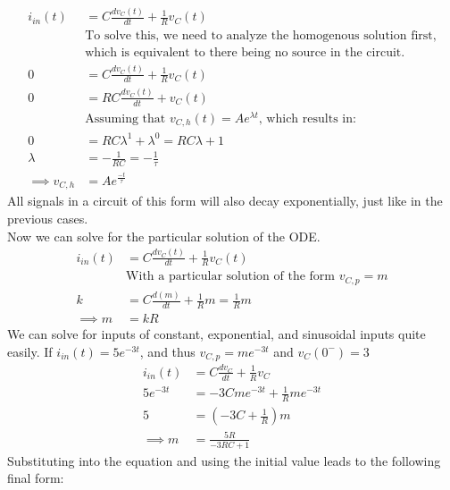 \documentclass[nobib]{tufte-handout}
\begin{document}
\begin{align*}
    i_{in}(t)        & = C\frac{dv_C(t)}{dt}+\frac{1}{R}v_C(t)                                 \\
                     & \text{To solve this, we need to analyze the homogenous solution first,} \\ &\text{which is equivalent to there being no source in the circuit.}\\
    0                & = C\frac{dv_C(t)}{dt}+\frac{1}{R}v_C(t)                                 \\
    0                & = RC\frac{dv_C(t)}{dt}+v_C(t)                                           \\
                     & \text{Assuming that $v_{C,h}(t) = Ae^{\lambda t}$, which results in:}   \\
    0                & = RC \lambda^1 + \lambda^0 = RC \lambda +1                              \\
    \lambda          & = -\frac{1}{RC} = -\frac{1}{\tau}                                       \\
    \implies v_{C,h} & = Ae^{\frac{-t}{\tau}}
\end{align*}
All signals in a circuit of this form will also decay exponentially, just like in the previous cases.\\
Now we can solve for the particular solution of the ODE.\\
\begin{align*}
    i_{in}(t)  & = C\frac{dv_C(t)}{dt}+\frac{1}{R}v_C(t)                   \\
               & \text{With a particular solution of the form $v_{C,p}=m$} \\
    k          & = C\frac{d(m)}{dt}+\frac{1}{R}m=\frac{1}{R}m              \\
    \implies m & =kR
\end{align*}
We can solve for inputs of constant, exponential, and sinusoidal inputs quite easily.
If $i_{in}(t) = 5e^{-3t}$, and thus $v_{C,p}=me^{-3t}$ and $v_C(0^-)=3$
\begin{align*}
    i_{in}(t)  & = C\frac{dv_C}{dt}+\frac{1}{R}v_C \\
    5e^{-3t}   & = -3Cme^{-3t}+\frac{1}{R}me^{-3t} \\
    5          & = \left(-3C+\frac{1}{R}\right)m   \\
    \implies m & = \frac{5R}{-3RC+1}
\end{align*}
Substituting into the equation and using the initial value leads to the following final form:
\end{document}

